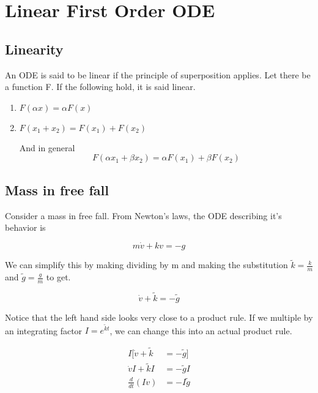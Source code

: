 \chapter{Linear First Order ODE}
%
%
%
%


\section{Linearity}

\begin{leftbar}
\begin{define}
	An ODE is said to be linear if the principle of superposition applies. Let there be a function F. If the following hold, it is said linear.
	\begin{enumerate}
		\item $F(\alpha x) = \alpha F(x)$
		\item $F(x_{1} + x_{2}) = F(x_{1}) + F(x_{2})$
		
	And in general
	\[
	F(\alpha x_{1} + \beta x_{2}) = \alpha F(x_{1}) + \beta F(x_{2})
	\]
	\end{enumerate}
\end{define}
\end{leftbar}

\section{Mass in free fall}
	Consider a mass in free fall. From Newton's laws, the ODE describing it's behavior is

\[
m\dot{v} + kv = -g
\]

We can simplify this by making dividing by m and making the substitution $\tilde{k} = \frac{k}{m}$ and $\tilde{g} = \frac{g}{m}$ to get.

\[
\dot{v}+\tilde{k}=-\tilde{g}
\]

Notice that the left hand side looks very close to a product rule. If we multiple by an integrating factor $I=e^{\tilde{k}t}$, we can change this into an actual product rule.

\[
\begin{aligned}
I[\dot{v}+\tilde{k} &= -\tilde{g}]\\
\dot{v}I+\tilde{k}I &= -\tilde{g}I\\
\frac{d}{dt}(Iv) &= -I\tilde{g}
\end{aligned}
\]

